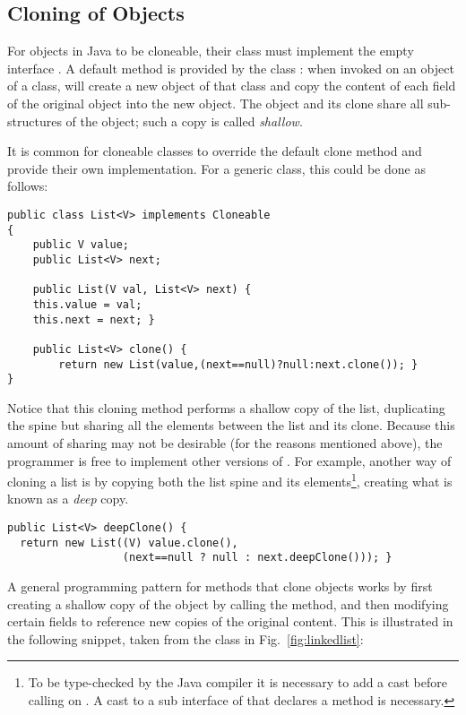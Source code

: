 \documentclass{LMCS}
\newcommand{\ttt}[1]{}
\begin{document}
\subsection{Cloning of Objects}
\label{sec:intro:cloning}

For objects in Java to be cloneable, their class must implement the
empty interface \ttt{Cloneable}. A default \ttt{clone} method is
provided by the class \ttt{Object}: when invoked on an object of a
class, \ttt{Object.clone} will create a new object of that class and
copy the content of each field of the original object into the new
object. The object and its clone share all sub-structures of the
object; such a copy is called \textit{shallow}. 

It is common for cloneable classes to override the default clone
method and provide their own implementation. For a generic
\ttt{List} class, this could be done as follows:

\begin{lstlisting}
public class List<V> implements Cloneable
{
    public V value;
    public List<V> next;

    public List(V val, List<V> next) {
	this.value = val;
	this.next = next; }

    public List<V> clone() {
        return new List(value,(next==null)?null:next.clone()); }
}  
\end{lstlisting}
Notice that this cloning method performs a shallow copy of the list,
duplicating the spine but sharing all the elements between the list and its
clone. Because this amount of sharing may not be desirable (for the reasons
mentioned above), the programmer is free to implement other versions of
\ttt{clone()}. For example, another way of cloning a list is by copying both
the list spine and its elements\footnote{To be type-checked by the Java
compiler it is necessary to add a cast before calling \ttt{clone()} on
\ttt{value}. A cast to a sub interface of \ttt{Cloneable} that declares a
\ttt{clone()} method is necessary.}, creating what is known as a \textit{deep}
copy. 
\begin{lstlisting}
public List<V> deepClone() {
  return new List((V) value.clone(),
                  (next==null ? null : next.deepClone())); }  
\end{lstlisting}

\noindent A general programming pattern for methods that clone objects works by first
creating a shallow copy of the object by calling the \ttt{super.clone()}
method, and then modifying certain fields to reference new copies of the original
content. This is illustrated in the following snippet, taken from the class
\ttt{LinkedList} in Fig.~\ref{fig:linkedlist}:
\end{document}
